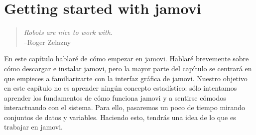 

\chapter{Getting started with jamovi\label{ch:introj}}

\begin{quote}
{\it Robots are nice to work with.}\\ 
\hspace*{2cm}--Roger Zelazny
\end{quote}


\noindent
En este capítulo hablaré de cómo empezar en jamovi. Hablaré brevemente sobre cómo descargar e instalar jamovi, pero la mayor parte del capítulo se centrará en que empieces a familiarizarte con la interfaz gráfica de jamovi. Nuestro objetivo en este capítulo no es aprender ningún concepto estadístico: sólo intentamos aprender los fundamentos de cómo funciona jamovi y a sentirse cómodos interactuando con el sistema. Para ello, pasaremos un poco de tiempo mirando conjuntos de datos y variables. Haciendo esto, tendrás una idea de lo que es trabajar en jamovi.

